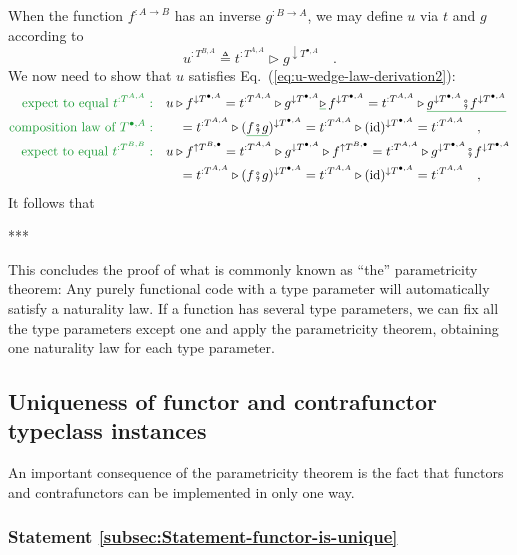When the function $f^{:A\rightarrow B}$ has an inverse $g^{:B\rightarrow A}$,
we may define $u$ via $t$ and $g$ according to
\[
u^{:T^{B,A}}\triangleq t^{:T^{A,A}}\triangleright g^{\downarrow T^{\bullet,A}}\quad.
\]
We now need to show that $u$ satisfies Eq.~(\ref{eq:u-wedge-law-derivation2}):
\begin{align*}
{\color{greenunder}\text{expect to equal }t^{:T^{A,A}}:}\quad & u\triangleright f^{\downarrow T^{\bullet,A}}=t^{:T^{A,A}}\triangleright g^{\downarrow T^{\bullet,A}}\gunderline{\triangleright}\,f^{\downarrow T^{\bullet,A}}=t^{:T^{A,A}}\triangleright\gunderline{g^{\downarrow T^{\bullet,A}}\bef f^{\downarrow T^{\bullet,A}}}\\
{\color{greenunder}\text{composition law of }T^{\bullet,A}:}\quad & \quad=t^{:T^{A,A}}\triangleright(\gunderline{f\bef g})^{\downarrow T^{\bullet,A}}=t^{:T^{A,A}}\triangleright(\text{id})^{\downarrow T^{\bullet,A}}=t^{:T^{A,A}}\quad,\\
{\color{greenunder}\text{expect to equal }t^{:T^{B,B}}:}\quad & u\triangleright f^{\uparrow T^{B,\bullet}}=t^{:T^{A,A}}\triangleright g^{\downarrow T^{\bullet,A}}\triangleright f^{\uparrow T^{B,\bullet}}=t^{:T^{A,A}}\triangleright g^{\downarrow T^{\bullet,A}}\bef f^{\downarrow T^{\bullet,A}}\\
 & \quad=t^{:T^{A,A}}\triangleright(f\bef g)^{\downarrow T^{\bullet,A}}=t^{:T^{A,A}}\triangleright(\text{id})^{\downarrow T^{\bullet,A}}=t^{:T^{A,A}}\quad,
\end{align*}
It follows that 

{*}{*}{*}

This concludes the proof of what is commonly known as ``the'' parametricity
theorem: Any purely functional code with a type parameter will automatically
satisfy a naturality law. If a function has several type parameters,
we can fix all the type parameters except one and apply the parametricity
theorem, obtaining one naturality law for each type parameter.

\subsection{Uniqueness of functor and contrafunctor typeclass instances\label{sec:Uniqueness-of-functor-and-contrafunctor}}

An important consequence of the parametricity theorem is the fact
that functors and contrafunctors can be implemented in only one way.

\subsubsection{Statement \label{subsec:Statement-functor-is-unique}\ref{subsec:Statement-functor-is-unique}}

